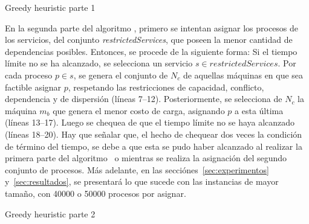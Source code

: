 \documentclass[../informe2.tex]{subfiles}
\begin{document}
\begin{algorithm}[h]
	\caption{Greedy heuristic parte 1}\label{greedy-1}
	\begin{algorithmic}[1]
				\EndIf{}
			\EndFor{}
			\EndIf{}

			\EndIf{}
		\EndFor{}
		\EndProcedure{}
	\end{algorithmic}
\end{algorithm}

En la segunda parte del algoritmo \greedy, primero se intentan asignar los procesos de los servicios, del conjunto \textit{restrictedServices}, que poseen la menor cantidad de dependencias posibles. Entonces, se procede de la siguiente forma: Si el tiempo límite no se ha alcanzado, se selecciona un servicio $s \in restrictedServices$. Por cada proceso $p \in s$, se genera el conjunto de $N_c$ de aquellas máquinas en que sea factible asignar $p$, respetando las restricciones de capacidad, conflicto, dependencia y de dispersión (líneas 7--12). Posteriormente, se selecciona de $N_c$ la máquina $m_b$ que genera el menor costo de carga, asignando $p$ a esta última (líneas 13--17). Luego se chequea de que el tiempo límite no se haya alcanzado (líneas 18--20). Hay que señalar que, el hecho de chequear dos veces la condición de término del tiempo, se debe a que esta se pudo haber alcanzado al realizar la primera parte del algoritmo \greedy\ o mientras se realiza la asignación del segundo conjunto de procesos. Más adelante, en las secciónes~\ref{sec:experimentos} y~\ref{sec:resultados}, se presentará lo que sucede con las instancias de mayor tamaño, con 40000 o 50000 procesos por asignar.\\

\begin{algorithm}[h]
	\caption{Greedy heuristic parte 2}\label{greedy-2}
	\begin{algorithmic}[1]
			\EndIf{}
					\EndIf{}
				\EndFor{}
				\EndIf{}
				\EndIf{}
			\EndFor{}
		\EndFor{}
		\EndProcedure{}
	\end{algorithmic}
\end{algorithm}
\end{document}
